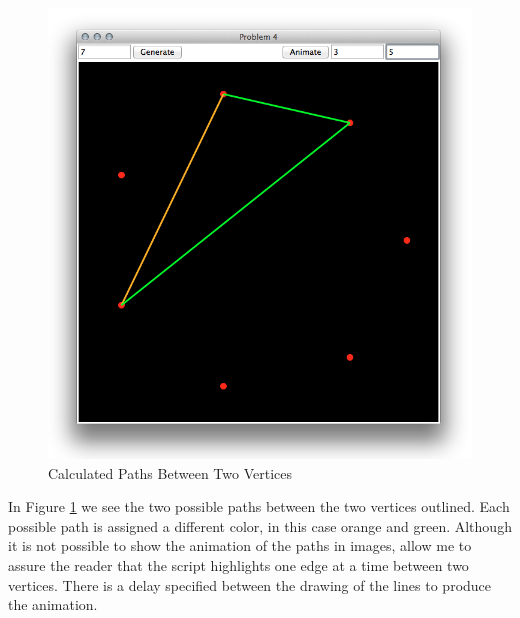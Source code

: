 \begin{figure}[H]
    \centering
        \includegraphics[width=4.75in,trim=1in .6in 1in 1in]{include/prob4paths.png}
    \caption{Calculated Paths Between Two Vertices}
    \label{fig:include_prob4paths}
\end{figure}
In Figure \ref{fig:include_prob4paths} we see the two possible paths between the two vertices outlined. Each possible path is assigned a different color, in this case orange and green. Although it is not possible to show the animation of the paths in images, allow me to assure the reader that the script highlights one edge at a time between two vertices. There is a delay specified between the drawing of the lines to produce the animation.

